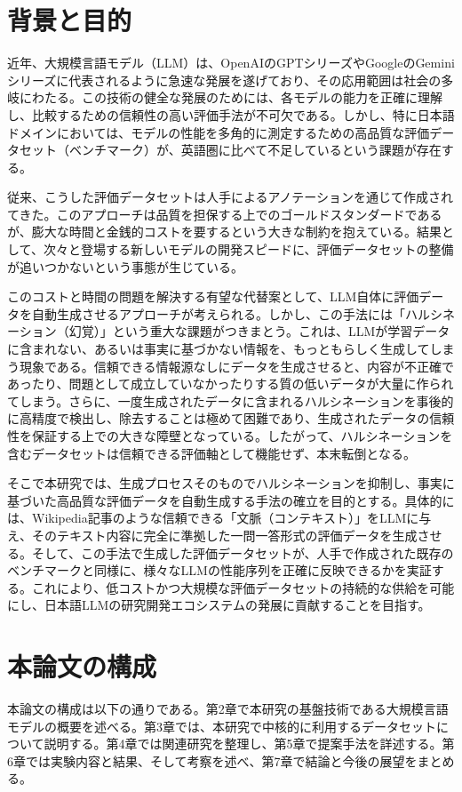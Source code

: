\documentclass[a4paper,11pt]{jreport}
\begin{document}
\section{背景と目的}
近年、大規模言語モデル（LLM）は、OpenAIのGPTシリーズ\cite{GPT-3}やGoogleのGeminiシリーズに代表されるように急速な発展を遂げており、その応用範囲は社会の多岐にわたる。この技術の健全な発展のためには、各モデルの能力を正確に理解し、比較するための信頼性の高い評価手法が不可欠である。しかし、特に日本語ドメインにおいては、モデルの性能を多角的に測定するための高品質な評価データセット（ベンチマーク）が、英語圏に比べて不足しているという課題が存在する\cite{Okazaki:COLM2024}。

従来、こうした評価データセットは人手によるアノテーションを通じて作成されてきた。このアプローチは品質を担保する上でのゴールドスタンダードであるが、膨大な時間と金銭的コストを要するという大きな制約を抱えている。結果として、次々と登場する新しいモデルの開発スピードに、評価データセットの整備が追いつかないという事態が生じている。

このコストと時間の問題を解決する有望な代替案として、LLM自体に評価データを自動生成させるアプローチが考えられる。しかし、この手法には「ハルシネーション（幻覚）」という重大な課題がつきまとう。これは、LLMが学習データに含まれない、あるいは事実に基づかない情報を、もっともらしく生成してしまう現象である。信頼できる情報源なしにデータを生成させると、内容が不正確であったり、問題として成立していなかったりする質の低いデータが大量に作られてしまう。さらに、一度生成されたデータに含まれるハルシネーションを事後的に高精度で検出し、除去することは極めて困難であり、生成されたデータの信頼性を保証する上での大きな障壁となっている。したがって、ハルシネーションを含むデータセットは信頼できる評価軸として機能せず、本末転倒となる。

そこで本研究では、生成プロセスそのものでハルシネーションを抑制し、事実に基づいた高品質な評価データを自動生成する手法の確立を目的とする。具体的には、Wikipedia記事のような信頼できる「文脈（コンテキスト）」をLLMに与え、そのテキスト内容に完全に準拠した一問一答形式の評価データを生成させる。そして、この手法で生成した評価データセットが、人手で作成された既存のベンチマークと同様に、様々なLLMの性能序列を正確に反映できるかを実証する。これにより、低コストかつ大規模な評価データセットの持続的な供給を可能にし、日本語LLMの研究開発エコシステムの発展に貢献することを目指す。

\section{本論文の構成}
本論文の構成は以下の通りである。第2章で本研究の基盤技術である大規模言語モデルの概要を述べる。第3章では、本研究で中核的に利用するデータセットについて説明する。第4章では関連研究を整理し、第5章で提案手法を詳述する。第6章では実験内容と結果、そして考察を述べ、第7章で結論と今後の展望をまとめる。
\end{document}
